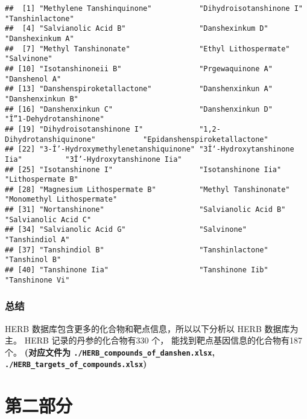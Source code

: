 \documentclass[
]{article}
\begin{document}
\begin{verbatim}
##  [1] "Methylene Tanshinquinone"           "Dihydroisotanshinone I"             "Tanshinlactone"                    
##  [4] "Salvianolic Acid B"                 "Danshexinkum D"                     "Danshexinkum A"                    
##  [7] "Methyl Tanshinonate"                "Ethyl Lithospermate"                "Salvinone"                         
## [10] "Isotanshinoneii B"                  "Prgewaquinone A"                    "Danshenol A"                       
## [13] "Danshenspiroketallactone"           "Danshenxinkun A"                    "Danshenxinkun B"                   
## [16] "Danshenxinkun C"                    "Danshenxinkun D"                    "Î”1-Dehydrotanshinone"             
## [19] "Dihydroisotanshinone I"             "1,2-Dihydrotanshiquinone"           "Epidanshenspiroketallactone"       
## [22] "3-Î’-Hydroxymethylenetanshiquinone" "3Î‘-Hydroxytanshinone Iia"          "3Î’-Hydroxytanshinone Iia"         
## [25] "Isotanshinone I"                    "Isotanshinone Iia"                  "Lithospermate B"                   
## [28] "Magnesium Lithospermate B"          "Methyl Tanshinonate"                "Monomethyl Lithospermate"          
## [31] "Nortanshinone"                      "Salvianolic Acid B"                 "Salvianolic Acid C"                
## [34] "Salvianolic Acid G"                 "Salvinone"                          "Tanshindiol A"                     
## [37] "Tanshindiol B"                      "Tanshinlactone"                     "Tanshinol B"                       
## [40] "Tanshinone Iia"                     "Tanshinone Iib"                     "Tanshinone Vi"
\end{verbatim}

\hypertarget{ux603bux7ed3}{%
\subsubsection{总结}\label{ux603bux7ed3}}

HERB 数据库包含更多的化合物和靶点信息，所以以下分析以 HERB 数据库为主。
HERB 记录的丹参的化合物有330 个，
能找到靶点基因信息的化合物有187个。
\textbf{(对应文件为 \texttt{./HERB\_compounds\_of\_danshen.xlsx}, \texttt{./HERB\_targets\_of\_compounds.xlsx})}

\hypertarget{ux7b2cux4e8cux90e8ux5206}{%
\section{第二部分}\label{ux7b2cux4e8cux90e8ux5206}}
\end{document}
